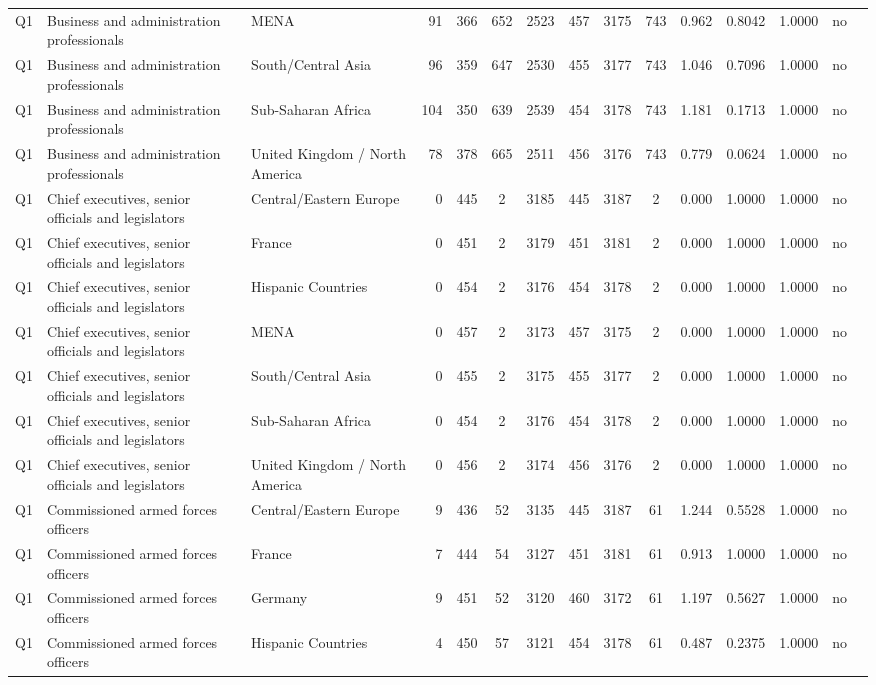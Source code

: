 \begin{longtable}{lllrcccccccccll}
Q1 & Business and administration professionals & MENA & 91 & 366 & 652 & 2523 & 457 & 3175 & 743 & 0.962 & 0.8042 & 1.0000 & no \\
Q1 & Business and administration professionals & South/Central Asia & 96 & 359 & 647 & 2530 & 455 & 3177 & 743 & 1.046 & 0.7096 & 1.0000 & no \\
Q1 & Business and administration professionals & Sub-Saharan Africa & 104 & 350 & 639 & 2539 & 454 & 3178 & 743 & 1.181 & 0.1713 & 1.0000 & no \\
Q1 & Business and administration professionals & United Kingdom / North America & 78 & 378 & 665 & 2511 & 456 & 3176 & 743 & 0.779 & 0.0624 & 1.0000 & no \\
Q1 & Chief executives, senior officials and legislators & Central/Eastern Europe & 0 & 445 & 2 & 3185 & 445 & 3187 & 2 & 0.000 & 1.0000 & 1.0000 & no \\
Q1 & Chief executives, senior officials and legislators & France & 0 & 451 & 2 & 3179 & 451 & 3181 & 2 & 0.000 & 1.0000 & 1.0000 & no \\
Q1 & Chief executives, senior officials and legislators & Hispanic Countries & 0 & 454 & 2 & 3176 & 454 & 3178 & 2 & 0.000 & 1.0000 & 1.0000 & no \\
Q1 & Chief executives, senior officials and legislators & MENA & 0 & 457 & 2 & 3173 & 457 & 3175 & 2 & 0.000 & 1.0000 & 1.0000 & no \\
Q1 & Chief executives, senior officials and legislators & South/Central Asia & 0 & 455 & 2 & 3175 & 455 & 3177 & 2 & 0.000 & 1.0000 & 1.0000 & no \\
Q1 & Chief executives, senior officials and legislators & Sub-Saharan Africa & 0 & 454 & 2 & 3176 & 454 & 3178 & 2 & 0.000 & 1.0000 & 1.0000 & no \\
Q1 & Chief executives, senior officials and legislators & United Kingdom / North America & 0 & 456 & 2 & 3174 & 456 & 3176 & 2 & 0.000 & 1.0000 & 1.0000 & no \\
Q1 & Commissioned armed forces officers & Central/Eastern Europe & 9 & 436 & 52 & 3135 & 445 & 3187 & 61 & 1.244 & 0.5528 & 1.0000 & no \\
Q1 & Commissioned armed forces officers & France & 7 & 444 & 54 & 3127 & 451 & 3181 & 61 & 0.913 & 1.0000 & 1.0000 & no \\
Q1 & Commissioned armed forces officers & Germany & 9 & 451 & 52 & 3120 & 460 & 3172 & 61 & 1.197 & 0.5627 & 1.0000 & no \\
Q1 & Commissioned armed forces officers & Hispanic Countries & 4 & 450 & 57 & 3121 & 454 & 3178 & 61 & 0.487 & 0.2375 & 1.0000 & no \\

\end{longtable}

